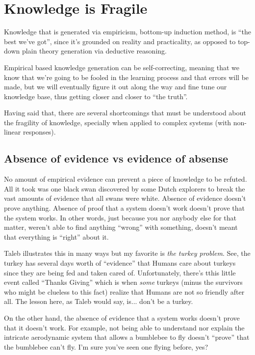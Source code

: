 \section{Knowledge is Fragile}

Knowledge that is generated via empiricism, bottom-up induction method, is ``the best we've got'', since it's grounded on reality and practicality, as opposed to top-down plain theory generation via deductive reasoning.

Empirical based knowledge generation can be self-correcting, meaning that we know that we're going to be fooled in the learning process and that errors will be made, but we will eventually figure it out along the way and fine tune our knowledge base, thus getting closer and closer to ``the truth''.

Having said that, there are several shortcomings that must be understood about the fragility of knowledge, specially when applied to complex systems (with non-linear responses).

\subsection{Absence of evidence vs evidence of absense}
No amount of empirical evidence can prevent a piece of knowledge to be refuted. All it took was one black swan discovered by some Dutch explorers to break the vast amounts of evidence that all swans were white. Absence of evidence doesn't prove anything. Absence of proof that a system doesn't work doesn't prove that the system works. In other words, just because you nor anybody else for that matter, weren't able to find anything ``wrong'' with something, doesn't meant that everything is ``right'' about it.

Taleb illustrates this in many ways but my favorite is \emph{the turkey problem}. See, the turkey has several days worth of ``evidence'' that Humans care about turkeys since they are being fed and taken cared of. Unfortunately, there's tthis little event called ``Thanks Giving'' which is when \textit{some} turkeys (minus the survivors who might be clueless to this fact) realize that Humans are not so friendly after all. 
The lesson here, as Taleb would say, is... don't be a turkey.

On the other hand, the absence of evidence that a system works doesn't prove that it doesn't work. For example, not being able to understand nor explain the intricate aerodynamic system that allows a bumblebee to fly doesn't ``prove'' that the bumblebee can't fly. I'm sure you've seen one flying before, yes?

